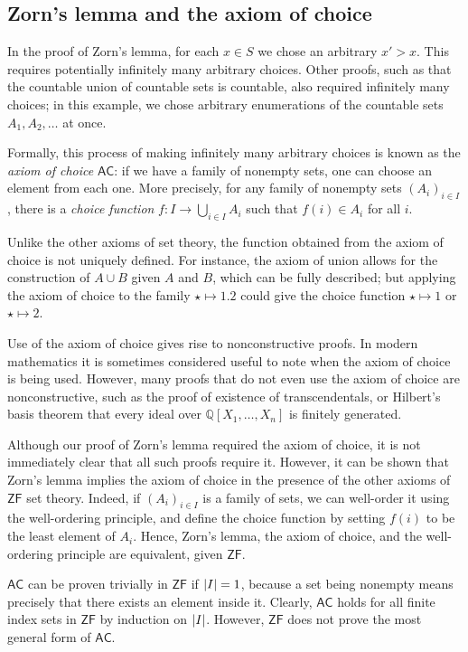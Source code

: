 \subsection{Zorn's lemma and the axiom of choice}
In the proof of Zorn's lemma, for each \( x \in S \) we chose an arbitrary \( x' > x \).
This requires potentially infinitely many arbitrary choices.
Other proofs, such as that the countable union of countable sets is countable, also required infinitely many choices; in this example, we chose arbitrary enumerations of the countable sets \( A_1, A_2, \dots \) at once.

Formally, this process of making infinitely many arbitrary choices is known as the \emph{axiom of choice} \( \mathsf{AC} \): if we have a family of nonempty sets, one can choose an element from each one.
More precisely, for any family of nonempty sets \( (A_i)_{i \in I} \), there is a \emph{choice function} \( f \colon I \to \bigcup_{i \in I} A_i \) such that \( f(i) \in A_i \) for all \( i \).

Unlike the other axioms of set theory, the function obtained from the axiom of choice is not uniquely defined.
For instance, the axiom of union allows for the construction of \( A \cup B \) given \( A \) and \( B \), which can be fully described; but applying the axiom of choice to the family \( \star \mapsto \qty{1, 2} \) could give the choice function \( \star \mapsto 1 \) or \( \star \mapsto 2 \).

Use of the axiom of choice gives rise to nonconstructive proofs.
In modern mathematics it is sometimes considered useful to note when the axiom of choice is being used.
However, many proofs that do not even use the axiom of choice are nonconstructive, such as the proof of existence of transcendentals, or Hilbert's basis theorem that every ideal over \( \mathbb Q[X_1, \dots, X_n] \) is finitely generated.

Although our proof of Zorn's lemma required the axiom of choice, it is not immediately clear that all such proofs require it.
However, it can be shown that Zorn's lemma implies the axiom of choice in the presence of the other axioms of \( \mathsf{ZF} \) set theory.
Indeed, if \( (A_i)_{i \in I} \) is a family of sets, we can well-order it using the well-ordering principle, and define the choice function by setting \( f(i) \) to be the least element of \( A_i \).
Hence, Zorn's lemma, the axiom of choice, and the well-ordering principle are equivalent, given \( \mathsf{ZF} \).

\( \mathsf{AC} \) can be proven trivially in \( \mathsf{ZF} \) if \( \abs{I} = 1 \), because a set being nonempty means precisely that there exists an element inside it.
Clearly, \( \mathsf{AC} \) holds for all finite index sets in \( \mathsf{ZF} \) by induction on \( \abs{I} \).
However, \( \mathsf{ZF} \) does not prove the most general form of \( \mathsf{AC} \).

